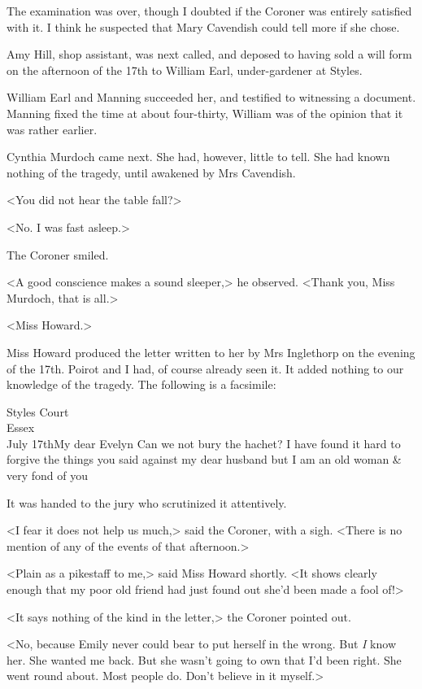  The examination was over, though I doubted if the Coroner was entirely satisfied with it. I think he suspected that Mary Cavendish could tell more if she chose. 

 Amy Hill, shop assistant, was next called, and deposed to having sold a will form on the afternoon of the 17th to William Earl, under-gardener at Styles. 

 William Earl and Manning succeeded her, and testified to witnessing a document. Manning fixed the time at about four-thirty, William was of the opinion that it was rather earlier. 

 Cynthia Murdoch came next. She had, however, little to tell. She had known nothing of the tragedy, until awakened by Mrs Cavendish. 

 <You did not hear the table fall?> 

 <No. I was fast asleep.> 

 The Coroner smiled. 

 <A good conscience makes a sound sleeper,> he observed. <Thank you, Miss Murdoch, that is all.> 

 <Miss Howard.> 

 Miss Howard produced the letter written to her by Mrs Inglethorp on the evening of the 17th. Poirot and I had, of course already seen it. It added nothing to our knowledge of the tragedy. The following is a facsimile: 


\begin{mail}{Styles Court\\Essex\\July 17th}{My dear Evelyn}
Can we not bury the hachet? I have found it hard to forgive the things you said against my dear husband but I am an old woman \& very fond of you

\end{mail}

 It was handed to the jury who scrutinized it attentively. 

 <I fear it does not help us much,> said the Coroner, with a sigh. <There is no mention of any of the events of that afternoon.> 

 <Plain as a pikestaff to me,> said Miss Howard shortly. <It shows clearly enough that my poor old friend had just found out she'd been made a fool of!> 

 <It says nothing of the kind in the letter,> the Coroner pointed out. 

 <No, because Emily never could bear to put herself in the wrong. But \emph{I} know her. She wanted me back. But she wasn't going to own that I'd been right. She went round about. Most people do. Don't believe in it myself.> 

